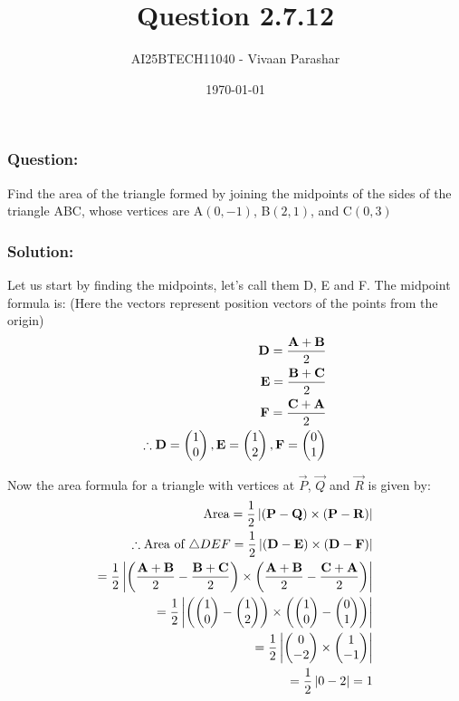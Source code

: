 \documentclass{beamer}
\title{Question 2.7.12}
\author{AI25BTECH11040 - Vivaan Parashar}
\date{\today}
\begin{document}
\frame{\titlepage}

\begin{frame}
    \frametitle{Question: }
    Find the area of the triangle formed by joining the midpoints of the sides of the triangle ABC, whose vertices are A$(0, -1)$, B$(2, 1)$, and C$(0, 3)$
\end{frame}

\begin{frame}
    \frametitle{Solution: }
    Let us start by finding the midpoints, let's call them D, E and F.
    The midpoint formula is: (Here the vectors represent position vectors of the points from the origin)
    \begin{align}
        \mathbf{D} = \frac{\mathbf{A}+\mathbf{B}}{2} \\
        \mathbf{E} = \frac{\mathbf{B}+\mathbf{C}}{2} \\
        \mathbf{F} = \frac{\mathbf{C}+\mathbf{A}}{2} \\
        \therefore \mathbf{D} = \begin{pmatrix}1       \\ 0\end{pmatrix}, \mathbf{E} = \begin{pmatrix}1 \\ 2\end{pmatrix}, \mathbf{F} = \begin{pmatrix}0 \\ 1\end{pmatrix}
    \end{align}
\end{frame}
\begin{frame}
    Now the area formula for a triangle with vertices at $\vec{P}$, $\vec{Q}$ and $\vec{R}$ is given by:
    \begin{align}
        \text{Area} = \frac{1}{2} \left| (\vec{P} - \vec{Q}) \times (\vec{P} - \vec{R}) \right|                              \\
        \therefore \text{Area of } \triangle DEF = \frac{1}{2} \left| (\vec{D} - \vec{E}) \times (\vec{D} - \vec{F}) \right| \\
            = \frac{1}{2} \left| \left( \frac{\vec{A}+\vec{B}}{2} - \frac{\vec{B}+\vec{C}}{2} \right) \times \left( \frac{\vec{A} + \vec{B}}{2} - \frac{\vec{C}+\vec{A}}{2}\right) \right| \\

        = \frac{1}{2} \left| \left( \myvec{1 \\ 0} - \myvec{1 \\ 2} \right) \times \left( \myvec{1 \\ 0} - \myvec{0 \\ 1} \right) \right|\\
        = \frac{1}{2} \left| \myvec{0 \\ -2} \times \myvec{1 \\ -1} \right|\\
        = \frac{1}{2} \left| 0 - 2 \right| = 1
    \end{align}
\end{frame}
\end{document}
